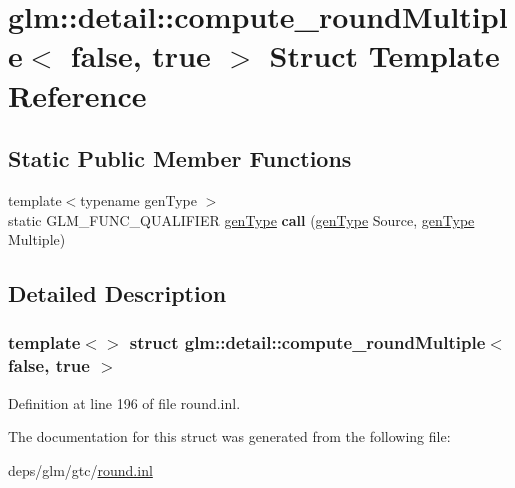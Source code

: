 \hypertarget{structglm_1_1detail_1_1compute__roundMultiple_3_01false_00_01true_01_4}{}\section{glm\+:\+:detail\+:\+:compute\+\_\+round\+Multiple$<$ false, true $>$ Struct Template Reference}
\label{structglm_1_1detail_1_1compute__roundMultiple_3_01false_00_01true_01_4}
\subsection*{Static Public Member Functions}
\begin{DoxyCompactItemize}
\item 
\mbox{\label{structglm_1_1detail_1_1compute__roundMultiple_3_01false_00_01true_01_4_a9f9791732bf5427c856feac9fed810da}} 
{\footnotesize template$<$typename gen\+Type $>$ }\\static G\+L\+M\+\_\+\+F\+U\+N\+C\+\_\+\+Q\+U\+A\+L\+I\+F\+I\+ER \hyperlink{structglm_1_1detail_1_1genType}{gen\+Type} {\bfseries call} (\hyperlink{structglm_1_1detail_1_1genType}{gen\+Type} Source, \hyperlink{structglm_1_1detail_1_1genType}{gen\+Type} Multiple)
\end{DoxyCompactItemize}


\subsection{Detailed Description}
\subsubsection*{template$<$$>$\newline
struct glm\+::detail\+::compute\+\_\+round\+Multiple$<$ false, true $>$}



Definition at line 196 of file round.\+inl.



The documentation for this struct was generated from the following file\+:\begin{DoxyCompactItemize}
\item 
deps/glm/gtc/\hyperlink{round_8inl}{round.\+inl}\end{DoxyCompactItemize}
